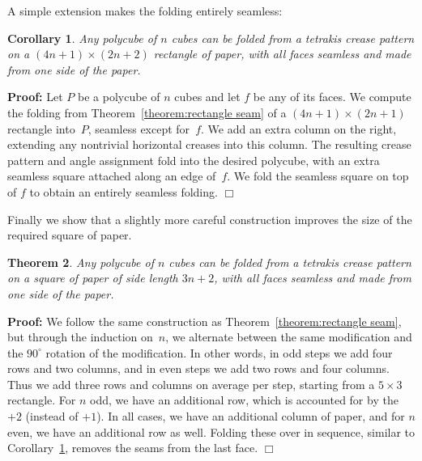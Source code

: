 \documentclass[11pt]{article}
\newtheorem{theorem}{Theorem}
\newtheorem{corollary}[theorem]{Corollary}
\newcommand{\theolab}[1]{\label{theorem:#1}}
\newcommand{\theoref}[1]{\ref{theorem:#1}}
\newenvironment{proof}{\noindent\textbf{Proof: }\ignorespaces}
  {\hspace*{\fill}$\Box$\medskip}
\begin{document}
A simple extension makes the folding entirely seamless:

\begin{corollary} \theolab{rectangle seamless}
  Any polycube of $n$ cubes can be folded from a tetrakis crease pattern
  on a $(4 n + 1) \times (2 n + 2)$ rectangle of paper,
  with all faces seamless and made from one side of the paper.
\end{corollary}

\begin{proof}
  Let $P$ be a polycube of $n$ cubes and let $f$ be any of its faces.
  We compute the folding from Theorem~\theoref{rectangle seam}
  of a $(4 n + 1) \times (2 n + 1)$ rectangle into~$P$,
  seamless except for~$f$.
  We add an extra column on the right,
  extending any nontrivial horizontal creases into this column.
  The resulting crease pattern and angle assignment fold into
  the desired polycube, with an extra seamless square
  attached along an edge of~$f$.
  We fold the seamless square on top of $f$
  to obtain an entirely seamless folding.
\end{proof}

Finally we show that a slightly more careful construction improves the
size of the required square of paper.

\begin{theorem} \theolab{cube}
  Any polycube of $n$ cubes can be folded from a tetrakis crease pattern
  on a square of paper of side length $3 n + 2$,
  with all faces seamless and made from one side of the paper.
\end{theorem}

\begin{proof}
  We follow the same construction as Theorem~\theoref{rectangle seam},
  but through the induction on~$n$, we alternate between the same modification
  and the $90^\circ$ rotation of the modification.  In other words,
  in odd steps we add four rows and two columns, and in even steps
  we add two rows and four columns.  Thus we add three rows and columns
  on average per step, starting from a $5 \times 3$ rectangle.
  For $n$ odd, we have an additional row, which is accounted for by the $+2$
  (instead of $+1$).
  In all cases, we have an additional column of paper, and for $n$ even,
  we have an additional row as well.  Folding these over in sequence,
  similar to Corollary~\theoref{rectangle seamless}, removes the seams
  from the last face.
\end{proof}
\end{document}
